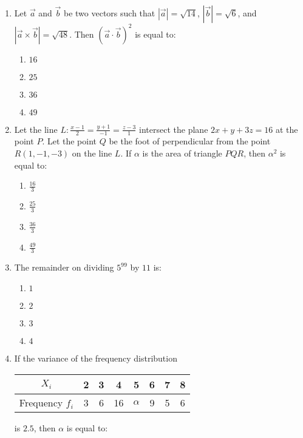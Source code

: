 \documentclass[journal]{IEEEtran}
\newcommand{\brak}[1]{\left( #1 \right)}
\newcommand{\abs}[1]{\left| #1 \right|}
\begin{document}
\begin{enumerate}
    \item Let $\vec{a}$ and $\vec{b}$ be two vectors such that $\abs{\vec{a}}=\sqrt{14}$, $\abs{\vec{b}}=\sqrt{6}$, and $\abs{\vec{a}\times\vec{b}}=\sqrt{48}$. Then $\brak{\vec{a}\cdot\vec{b}}^{2}$ is equal to:

        \begin{multicols}{4}
        \begin{enumerate}
        \item $16$
        \item $25$
        \item $36$
        \item $49$
        \end{enumerate}
        \end{multicols}

    \item Let the line $L:\frac{x-1}{2}=\frac{y+1}{-1}=\frac{z-3}{1}$ intersect the plane $2x+y+3z=16$ at the point $P$. Let the point $Q$ be the foot of perpendicular from the point $R\brak{1,-1,-3}$ on the line $L$. If $\alpha$ is the area of triangle $PQR$, then $\alpha^{2}$ is equal to:

        \begin{multicols}{4}
        \begin{enumerate}
        \item $\frac{16}{3}$
        \item $\frac{25}{3}$
        \item $\frac{36}{3}$
        \item $\frac{49}{3}$
        \end{enumerate}
        \end{multicols}

    \item The remainder on dividing $5^{99}$ by $11$ is:

        \begin{multicols}{4}
        \begin{enumerate}
        \item $1$
        \item $2$
        \item $3$
        \item $4$
        \end{enumerate}
        \end{multicols}
        
    \item If the variance of the frequency distribution
    \begin{tabular}{|c|c|c|c|c|c|c|c|}
    \hline
    $X_{i}$ & 2 & 3 & 4 & 5 & 6 & 7 & 8 \\ \hline
    Frequency $f_{i}$ & 3 & 6 & 16 & $\alpha$ & 9 & 5 & 6 \\ \hline
    \end{tabular}
    is $2.5$, then $\alpha$ is equal to:
    

\end{enumerate}
\end{document}

